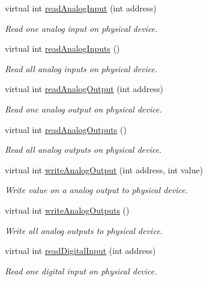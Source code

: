 \begin{DoxyCompactItemize}
\item 
virtual int \hyperlink{classmdt_device_ae0948ed309354e4d8b231eb911196749}{readAnalogInput} (int address)
\begin{DoxyCompactList}\small\item\em Read one analog input on physical device. \end{DoxyCompactList}\item 
virtual int \hyperlink{classmdt_device_ac0023742214c29bdadd46383ae240972}{readAnalogInputs} ()
\begin{DoxyCompactList}\small\item\em Read all analog inputs on physical device. \end{DoxyCompactList}\item 
virtual int \hyperlink{classmdt_device_abf222c1bd18ba300eeacd6037e5015df}{readAnalogOutput} (int address)
\begin{DoxyCompactList}\small\item\em Read one analog output on physical device. \end{DoxyCompactList}\item 
virtual int \hyperlink{classmdt_device_ae0a0f03cb5267232d176896acc80872c}{readAnalogOutputs} ()
\begin{DoxyCompactList}\small\item\em Read all analog outputs on physical device. \end{DoxyCompactList}\item 
virtual int \hyperlink{classmdt_device_a3d11f48e7b605a54c884977b773615e2}{writeAnalogOutput} (int address, int value)
\begin{DoxyCompactList}\small\item\em Write value on a analog output to physical device. \end{DoxyCompactList}\item 
virtual int \hyperlink{classmdt_device_a797eeb704d5104b7a4411ebeecb018c6}{writeAnalogOutputs} ()
\begin{DoxyCompactList}\small\item\em Write all analog outputs to physical device. \end{DoxyCompactList}\item 
virtual int \hyperlink{classmdt_device_a7e8f070a89d8f6f104f2cc5001f5c0d6}{readDigitalInput} (int address)
\begin{DoxyCompactList}\small\item\em Read one digital input on physical device. \end{DoxyCompactList}\item 

\end{DoxyCompactItemize}
